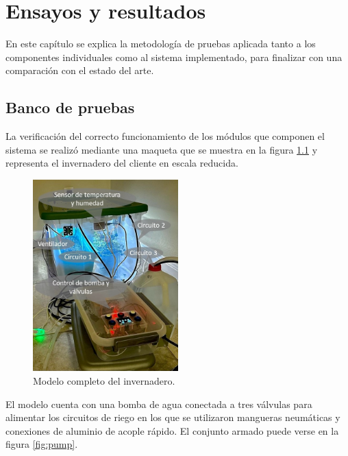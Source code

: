 
\chapter{Ensayos y resultados} %

\label{Chapter4} %

En este capítulo se explica la metodología de pruebas aplicada tanto a los componentes individuales como al sistema implementado, para finalizar con una comparación con el estado del arte.


\section{Banco de pruebas}
\label{sec:Banco de pruebas}
%
La verificación del correcto funcionamiento de los módulos que componen el sistema se realizó mediante una maqueta que se muestra en la figura \ref{fig:maqueta} y representa el invernadero del cliente en escala reducida.

\begin{figure}[H]
	\centering
	\includegraphics[width=0.50\textwidth]{./Figures/chapter4/maqueta.jpg}
	\caption[Modelo completo del invernadero]{Modelo completo del invernadero.}
	\label{fig:maqueta}
\end{figure}

El modelo cuenta con una bomba de agua conectada a tres válvulas para alimentar los circuitos de riego en los que se utilizaron mangueras neumáticas y conexiones de aluminio de acople rápido. El conjunto armado puede verse en la figura \ref{fig:pump}. 
  
